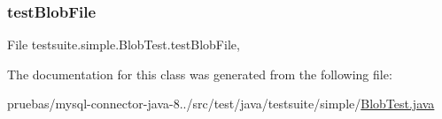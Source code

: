 \subsubsection{\texorpdfstring{test\+Blob\+File}{testBlobFile}}
{\footnotesize\ttfamily File testsuite.\+simple.\+Blob\+Test.\+test\+Blob\+File\hspace{0.3cm}{\ttfamily [static]}, {\ttfamily [protected]}}



The documentation for this class was generated from the following file\+:\begin{DoxyCompactItemize}
\item 
pruebas/mysql-\/connector-\/java-\/8../src/test/java/testsuite/simple/\mbox{\hyperlink{_blob_test_8java}{Blob\+Test.\+java}}\end{DoxyCompactItemize}

